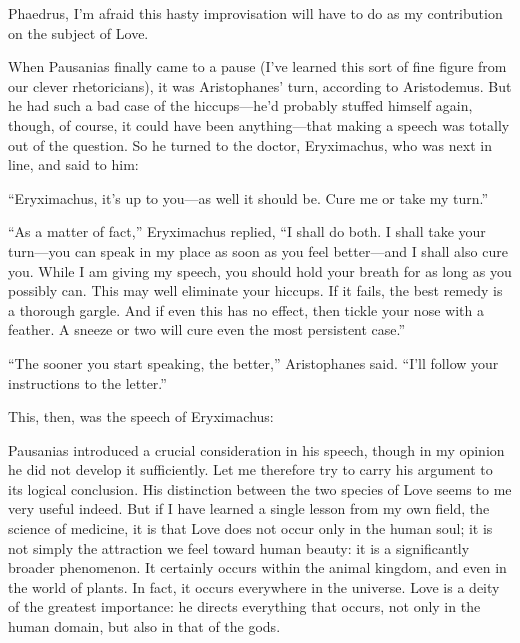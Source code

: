 Phaedrus, I'm afraid this hasty improvisation will have to do as my
contribution on the subject of Love.

When Pausanias finally came to a pause (I've learned this sort of fine
figure from our clever rhetoricians), it was Aristophanes' turn,
according to Aristodemus. But he had such a bad case of the
hiccups---he'd probably stuffed himself again, though, of course, it
could have been anything---that making a speech was totally out of the
question. So he turned to the doctor, Eryximachus, who was next in line,
and said to him: 

“Eryximachus, it's up to you---as well it should be. Cure me or take my
turn.”

“As a matter of fact,” Eryximachus replied, “I shall do both. I shall
take your turn---you can speak in my place as soon as you feel
better---and I shall also cure you. While I am giving my speech, you
should hold your breath for as long as you possibly can. This may well
eliminate your  hiccups. If it fails, the best remedy is a
thorough gargle. And if even this has no effect, then tickle your nose
with a feather. A sneeze or two will cure even the most persistent
case.”

“The sooner you start speaking, the better,” Aristophanes said. “I'll
follow your instructions to the letter.”

This, then, was the speech of Eryximachus:

\blank[line]

Pausanias introduced a crucial consideration in his speech, though in my
opinion he did not develop it sufficiently. Let me therefore try to
carry  his argument to its logical conclusion. His
distinction between the two species of Love seems to me very useful
indeed. But if I have learned a single lesson from my own field, the
science of medicine, it is that Love does not occur only in the human
soul; it is not simply the attraction we feel toward human beauty: it is
a significantly broader phenomenon. It  certainly occurs within
the animal kingdom, and even in the world of plants. In fact, it occurs
everywhere in the universe. Love is a deity of the greatest importance:
he directs everything that occurs, not only in the human domain, but
also in that of the gods.

